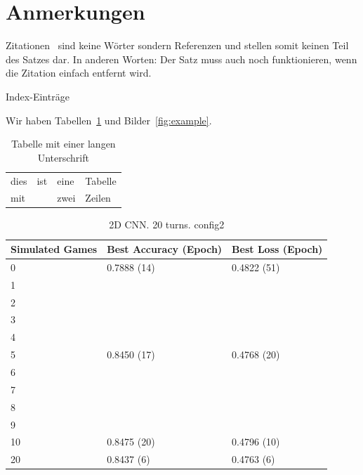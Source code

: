 \lipsum[1-3]

\section{Anmerkungen}
Zitationen~\cite{Rabiner89-ATO} sind keine Wörter sondern Referenzen und stellen somit keinen Teil des Satzes dar. In anderen Worten: Der Satz muss auch noch funktionieren, wenn die Zitation einfach entfernt wird.


Index-Einträge~

Wir haben Tabellen~\ref{tab:example} und Bilder~\ref{fig:example}.

\begin{table}
 \centering
 \begin{tabular}{llll}
  \toprule
  dies & ist & eine & Tabelle \\
  mit  &     & zwei & Zeilen \\
  \bottomrule
 \end{tabular}
 \caption[Tabelle mit kurzer Unterschrift]{Tabelle mit einer langen Unterschrift}
 \label{tab:example}
\end{table}

\begin{table}
	\centering
	\caption{2D CNN. 20 turns. config2}%
	\begin{tabular}{|l|l|l|}
		\hline
		Simulated Games & Best Accuracy (Epoch) & Best Loss (Epoch)\\
		\hline
		0 & 0.7888 (14) & 0.4822 (51) \\
		1 &  &  \\
		2 &  &  \\
		3 &  &  \\
		4 &  &  \\
		5 & 0.8450 (17) & 0.4768 (20) \\
		6 &  &  \\
		7 &  &  \\
		8 &  &  \\
		9 &  &  \\
		10 & 0.8475 (20) & 0.4796 (10) \\
		20 & 0.8437 (6) & 0.4763 (6) \\
		\hline
	\end{tabular}
\end{table}

